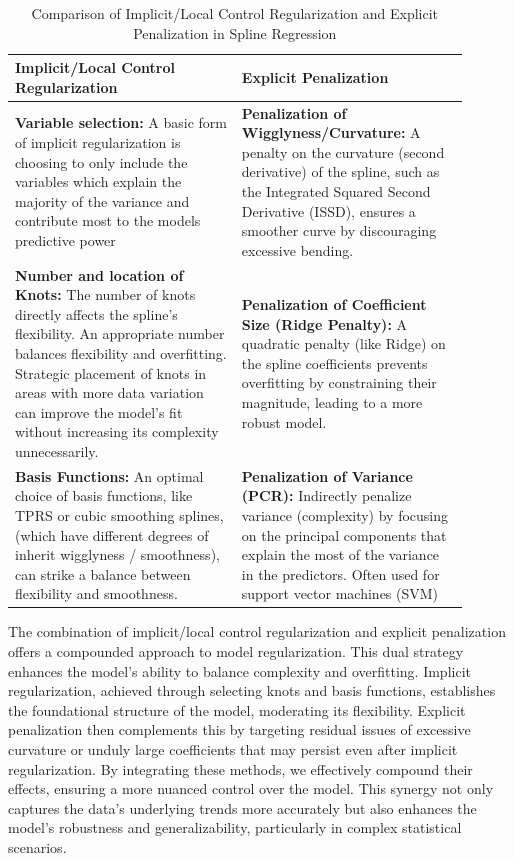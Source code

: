 \documentclass[12pt, twoside,hidelinks]{article}
\theoremstyle{definition}
\numberwithin{equation}{section}
\begin{document}
\begin{table}[H]
\centering
\begin{tabular}{|p{0.45\linewidth}|p{0.45\linewidth}|}
\hline
\textbf{Implicit/Local Control Regularization} & \textbf{Explicit Penalization} \\ \hline
\textbf{Variable selection:} A basic form of implicit regularization is choosing to only include the variables which explain the majority of the variance and contribute most to the models predictive power & \textbf{Penalization of Wigglyness/Curvature:} A penalty on the curvature (second derivative) of the spline, such as the Integrated Squared Second Derivative (ISSD), ensures a smoother curve by discouraging excessive bending. \\ \hline
\textbf{Number and location of Knots:} The number of knots directly affects the spline's flexibility. An appropriate number balances flexibility and overfitting. Strategic placement of knots in areas with more data variation can improve the model's fit without increasing its complexity unnecessarily.  & \textbf{Penalization of Coefficient Size (Ridge Penalty):} A quadratic penalty (like Ridge) on the spline coefficients prevents overfitting by constraining their magnitude, leading to a more robust model. \\ \hline
\textbf{Basis Functions:} An optimal choice of basis functions, like TPRS or cubic smoothing splines, (which have different degrees of inherit wigglyness / smoothness), can strike a balance between flexibility and smoothness. &  \textbf{Penalization of Variance (PCR):} Indirectly penalize variance (complexity) by focusing on the principal components that explain the most of the variance in the predictors. Often used for support vector machines (SVM) \\ \hline
\end{tabular}
\caption{Comparison of Implicit/Local Control Regularization and Explicit Penalization in Spline Regression}
\label{tab:regularization_penalization}
\end{table}

The combination of implicit/local control regularization and explicit penalization offers a compounded approach to model regularization. This dual strategy enhances the model's ability to balance complexity and overfitting. Implicit regularization, achieved through selecting knots and basis functions, establishes the foundational structure of the model, moderating its flexibility. Explicit penalization then complements this by targeting residual issues of excessive curvature or unduly large coefficients that may persist even after implicit regularization. By integrating these methods, we effectively compound their effects, ensuring a more nuanced control over the model. This synergy not only captures the data's underlying trends more accurately but also enhances the model's robustness and generalizability, particularly in complex statistical scenarios.
\end{document}
